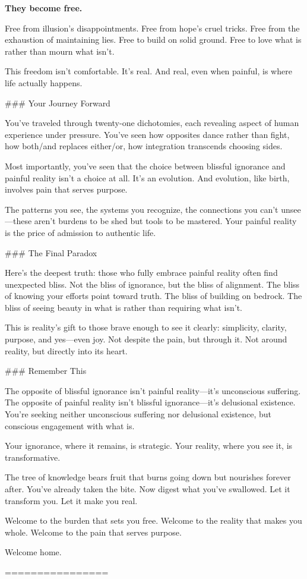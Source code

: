 \documentclass[12pt]{book}
\begin{document}
\textbf{They become free.}

Free from illusion's disappointments. Free from hope's cruel tricks. Free from the exhaustion of maintaining lies. Free to build on solid ground. Free to love what is rather than mourn what isn't.

This freedom isn't comfortable. It's real. And real, even when painful, is where life actually happens.

\#\#\# Your Journey Forward

You've traveled through twenty-one dichotomies, each revealing aspect of human experience under pressure. You've seen how opposites dance rather than fight, how both/and replaces either/or, how integration transcends choosing sides.

Most importantly, you've seen that the choice between blissful ignorance and painful reality isn't a choice at all. It's an evolution. And evolution, like birth, involves pain that serves purpose.

The patterns you see, the systems you recognize, the connections you can't unsee—these aren't burdens to be shed but tools to be mastered. Your painful reality is the price of admission to authentic life.

\#\#\# The Final Paradox

Here's the deepest truth: those who fully embrace painful reality often find unexpected bliss. Not the bliss of ignorance, but the bliss of alignment. The bliss of knowing your efforts point toward truth. The bliss of building on bedrock. The bliss of seeing beauty in what is rather than requiring what isn't.

This is reality's gift to those brave enough to see it clearly: simplicity, clarity, purpose, and yes—even joy. Not despite the pain, but through it. Not around reality, but directly into its heart.

\#\#\# Remember This

The opposite of blissful ignorance isn't painful reality—it's unconscious suffering. The opposite of painful reality isn't blissful ignorance—it's delusional existence. You're seeking neither unconscious suffering nor delusional existence, but conscious engagement with what is.

Your ignorance, where it remains, is strategic. Your reality, where you see it, is transformative.

The tree of knowledge bears fruit that burns going down but nourishes forever after. You've already taken the bite. Now digest what you've swallowed. Let it transform you. Let it make you real.

Welcome to the burden that sets you free. Welcome to the reality that makes you whole. Welcome to the pain that serves purpose.

Welcome home.

================
\end{document}

